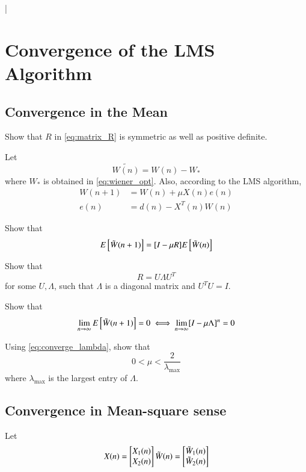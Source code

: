 |\documentclass[journal,12pt,twocolumn]{IEEEtran}
\begin{document}
\section{Convergence of the LMS Algorithm}
\subsection{Convergence in the Mean}
\begin{problem}
Show that $R$ in \eqref{eq:matrix_R} is symmetric as well as positive definite.
\end{problem}
%
Let
\begin{equation}
\tilde {W(n)}= W(n) - W_{*}
\end{equation}
%
where $W_{*}$ is obtained in \eqref{eq:wiener_opt}. Also, according to the LMS algorithm,
\begin{align}
\label{eq:wn_update}
W(n+1)&=W(n)+ \mu X(n) e(n)
\\
e(n) &= d(n) - X^{T}(n)W(n)
\end{align}
%
\begin{problem}
%
Show that
\begin{equation}
 E{}\left[\tilde W(n+1)\right]=[I - \mu R]E{}\left[\tilde W(n)\right]
\end{equation}
\end{problem}
\begin{problem}
Show that 
\begin{equation}
\label{eq:eigen_decompose}
R = U \Lambda U^{T}
\end{equation}
%
for some $U, \Lambda$, such that $\Lambda$ is a diagonal matrix and $U^TU = I$.
\end{problem}
%
\begin{problem}
Show that
\begin{equation}
\label{eq:converge_lambda}
\lim_{n \to \infty}E{}\left[\tilde W(n+1)\right] = 0 \iff \lim_{n\to \infty}[I - \mu \Lambda]^n = 0
\end{equation}
\end{problem}
%
\begin{problem}
Using \eqref{eq:converge_lambda}, show that
\begin{equation}
0 < \mu < \frac{2}{\lambda_{\max}}
\end{equation}
%
where $\lambda_{\max}$ is the largest entry of $\Lambda$.
\end{problem}
%
\subsection{Convergence in Mean-square sense}
Let 
\begin{equation}
 X(n)
 =
  \begin{bmatrix}
   X_1(n) \\ X_2(n)  \end{bmatrix}\\
\tilde W(n)
 =
  \begin{bmatrix}
   \tilde W_1(n) \\ \tilde W_2(n) \end{bmatrix}
\end{equation}
\end{document}
